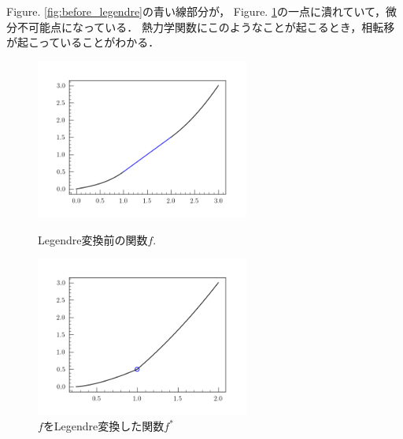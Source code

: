 Figure. \ref{fig:before_legendre}の青い線部分が，
Figure. \ref{fig:after_legendre}の一点に潰れていて，微分不可能点になっている．
熱力学関数にこのようなことが起こるとき，相転移が起こっていることがわかる．
\begin{figure}[htbp]
		\centering
		\begin{minipage}{0.45\linewidth}
				\centering
				\includegraphics[width=7cm]{./doc/img/eg1_legendre.png}
				\caption{Legendre変換前の関数$f$.}
				\label{fig:before_legendre}
		\end{minipage}
		\begin{minipage}{0.45\linewidth}
				\centering
				\includegraphics[width=7cm]{./doc/img/eg2_legendre.png}
				\caption{$f$をLegendre変換した関数$f^{*}$}
				\label{fig:after_legendre}
		\end{minipage}
\end{figure}
